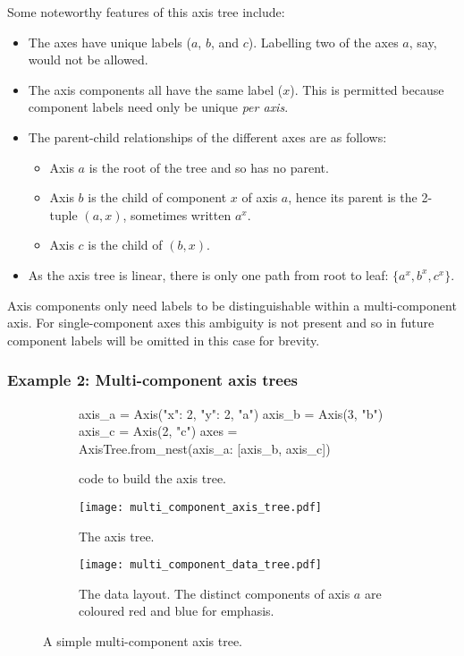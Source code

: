 \documentclass[thesis]{subfiles}
\begin{document}
Some noteworthy features of this axis tree include:
\begin{itemize}
  \item
    The axes have unique labels ($a$, $b$, and $c$).
    Labelling two of the axes $a$, say, would not be allowed.

  \item
    The axis components all have the same label ($x$).
    This is permitted because component labels need only be unique \emph{per axis}.

  \item
    The parent-child relationships of the different axes are as follows:
    \begin{itemize}
      \item Axis $a$ is the root of the tree and so has no parent.
      \item Axis $b$ is the child of component $x$ of axis $a$, hence its parent is the 2-tuple $(a, x)$, sometimes written $a^x$.
      \item Axis $c$ is the child of $(b, x)$.
    \end{itemize}

  \item
    As the axis tree is linear, there is only one path from root to leaf: $\{ a^x, b^x, c^x \}$.
\end{itemize}

Axis components only need labels to be distinguishable within a multi-component axis.
For single-component axes this ambiguity is not present and so in future component labels will be omitted in this case for brevity.

\subsubsection{Example 2: Multi-component axis trees}

\begin{figure}
  \begin{subfigure}{.9\textwidth}
    \begin{pyalg2}
      axis_a = Axis({"x": 2, "y": 2}, "a")
      axis_b = Axis(3, "b")
      axis_c = Axis(2, "c")
      axes = AxisTree.from_nest({axis_a: [axis_b, axis_c]})
    \end{pyalg2}
    \caption{ code to build the axis tree.}
  \end{subfigure}

  \vspace{1em}

  \begin{subfigure}{.4\textwidth}
    \centering
    \texttt{[image: multi\_component\_axis\_tree.pdf]}
    \caption{The axis tree.}
  \end{subfigure}
  \begin{subfigure}{.4\textwidth}
    \centering
    \texttt{[image: multi\_component\_data\_tree.pdf]}
    \caption{
      The data layout.
      The distinct components of axis $a$ are coloured red and blue for emphasis.
    }
    \label{fig:multi_component_data_tree}
  \end{subfigure}
  \caption{
    A simple multi-component axis tree.
  }
  \label{fig:multi_component_axis_tree_intro}
\end{figure}
\end{document}
